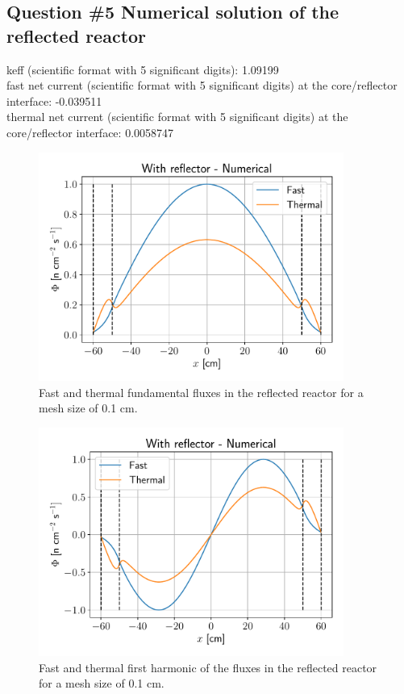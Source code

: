 \documentclass[11pt,a4paper]{article}
\begin{document}
\subsection{Question \#5 Numerical solution of the reflected reactor}


keff (scientific format with 5 significant digits): 1.09199 \\

fast net current (scientific format with 5 significant digits) at the core/reflector interface: -0.039511 \\

thermal net current (scientific format with 5 significant digits) at the core/reflector interface: 0.0058747 \\

\begin{figure}[H]
	\includegraphics[width=10cm]{fig/Ex3_ReflectorH0.pdf}
	\centering
	\caption{Fast and thermal fundamental fluxes in the reflected reactor for a mesh size of 0.1 cm.}
\end{figure}

\begin{figure}[H]
	\includegraphics[width=10cm]{fig/Ex3_ReflectorH1.pdf}
	\centering
	\caption{Fast and thermal first harmonic of the fluxes in the reflected reactor for a mesh size of 0.1 cm.}
\end{figure}
\end{document}
